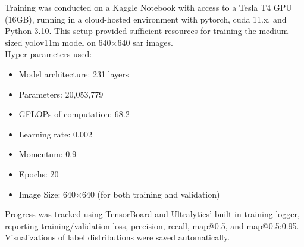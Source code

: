 \documentclass{article}
\begin{document}
Training was conducted on a Kaggle Notebook with access to a Tesla T4 GPU (16GB), running in a cloud-hosted environment with \acrshort{pytorch}, \acrshort{cuda} 11.x, and Python 3.10. This setup provided sufficient resources for training the medium-sized \acrshort{yolov11m} model on 640×640 \acrshort{sar} images.\\

Hyper-parameters used:
\begin{itemize}
    \item Model architecture: 231 layers
    \item Parameters: 20,053,779
    \item GFLOPs of computation: 68.2
    \item Learning rate: 0,002
    \item Momentum: 0.9
    \item Epochs: 20
    \item Image Size: 640×640 (for both training and validation)
\end{itemize}

Progress was tracked using TensorBoard and Ultralytics’ built-in training logger, reporting training/validation loss, precision, recall, \acrshort{map}@0.5, and \acrshort{map}@0.5:0.95. Visualizations of label distributions were saved automatically.\\
\end{document}
